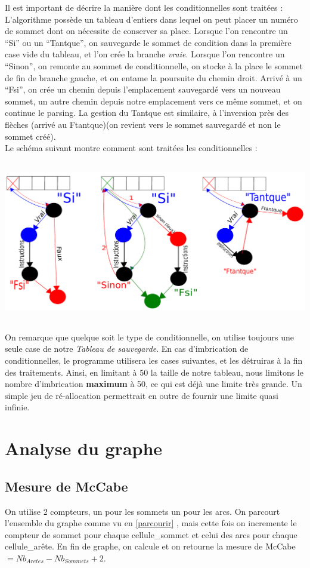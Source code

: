 \documentclass[a4paper,11pt]{article}
\begin{document}
		Il est important de décrire la manière dont les conditionnelles sont traitées :\\
		L'algorithme possède un tableau d'entiers dans lequel on peut placer un numéro de sommet dont on nécessite de conserver sa place. Lorsque l'on rencontre un ``Si'' ou un ``Tantque'', on sauvegarde le sommet de condition dans la première case vide du tableau, et l'on crée la branche \textit{vraie}. Lorsque l'on rencontre un ``Sinon'', on remonte au sommet de conditionnelle, on stocke à la place le sommet de fin de branche gauche, et on entame la poursuite du chemin droit. Arrivé à un ``Fsi'', on crée un chemin depuis l'emplacement sauvegardé vers un nouveau sommet, un autre chemin depuis notre emplacement vers ce même sommet, et on continue le parsing. La gestion du Tantque est similaire, à l'inversion près des flèches (arrivé au Ftantque)(on revient vers le sommet sauvegardé et non le sommet créé).\\
		 Le schéma suivant montre comment sont traitées les conditionnelles :
		\begin{center}\includegraphics[width=17cm,height=7cm]{dessin.pdf}\end{center}
	On remarque que quelque soit le type de conditionnelle, on utilise toujours une seule case de notre \textit{Tableau de sauvegarde}. En cas d'imbrication de conditionnelles, le programme utilisera les cases suivantes, et les détruiras à la fin des traitements. Ainsi, en limitant à 50 la taille de notre tableau, nous limitons le nombre d'imbrication \textbf{maximum} à 50, ce qui est déjà une limite très grande. Un simple jeu de ré-allocation permettrait en outre de fournir une limite quasi infinie.
	\section{Analyse du graphe}
	\subsection{Mesure de McCabe}
		On utilise 2 compteurs, un pour les sommets un pour les arcs. On parcourt l'ensemble du graphe comme vu en \ref{parcourir} , mais cette fois on incremente le compteur de sommet pour chaque cellule\_sommet et celui des arcs pour chaque cellule\_arête. En fin de graphe, on calcule et on retourne la mesure de McCabe $= Nb_{Aretes} - Nb_{Sommets} + 2$.
\end{document}
